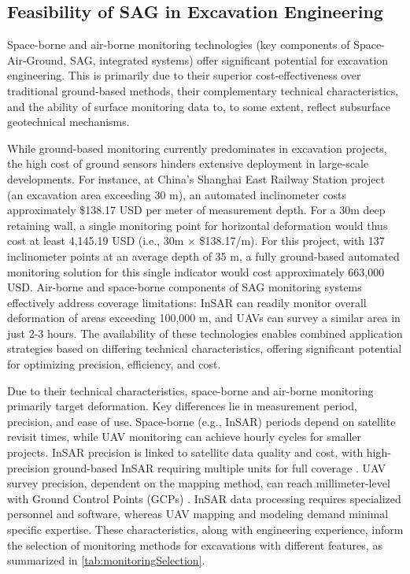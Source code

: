 \documentclass[preprint,11pt,authoryear,3p]{elsarticle}
\begin{document}
\subsection{Feasibility of SAG in Excavation Engineering}

Space-borne and air-borne monitoring technologies (key components of Space-Air-Ground, SAG, integrated systems) offer significant potential for excavation engineering. This is primarily due to their superior cost-effectiveness over traditional ground-based methods, their complementary technical characteristics, and the ability of surface monitoring data to, to some extent, reflect subsurface geotechnical mechanisms.

While ground-based monitoring currently predominates in excavation projects, the high cost of ground sensors hinders extensive deployment in large-scale developments. For instance, at China's Shanghai East Railway Station project (an excavation area exceeding 30 m), an automated inclinometer costs approximately \$138.17 USD per meter of measurement depth. For a 30m deep retaining wall, a single monitoring point for horizontal deformation would thus cost at least 4,145.19 USD (i.e., 30m × \$138.17/m). For this project, with 137 inclinometer points at an average depth of 35 m, a fully ground-based automated monitoring solution for this single indicator would cost approximately 663,000 USD. Air-borne and space-borne components of SAG monitoring systems effectively address coverage limitations: InSAR can readily monitor overall deformation of areas exceeding 100,000 m, and UAVs can survey a similar area in just 2-3 hours. The availability of these technologies enables combined application strategies based on differing technical characteristics, offering significant potential for optimizing precision, efficiency, and cost.

Due to their technical characteristics, space-borne and air-borne monitoring primarily target deformation. Key differences lie in measurement period, precision, and ease of use. Space-borne (e.g., InSAR) periods depend on satellite revisit times, while UAV monitoring can achieve hourly cycles for smaller projects. InSAR precision is linked to satellite data quality and cost, with high-precision ground-based InSAR requiring multiple units for full coverage \citep{rs11091029}. UAV survey precision, dependent on the mapping method, can reach millimeter-level with Ground Control Points (GCPs) \citep{MARTINEZCARRICONDO20181}. InSAR data processing requires specialized personnel and software, whereas UAV mapping and modeling demand minimal specific expertise. These characteristics, along with engineering experience, inform the selection of monitoring methods for excavations with different features, as summarized in \autoref{tab:monitoringSelection}.
\end{document}
